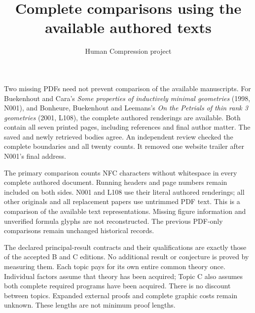 \documentclass[11pt,a4paper]{article}
\title{Complete comparisons using the available authored texts}
\author{Human Compression project}\date{}
\begin{document}
\maketitle
Two missing PDFs need not prevent comparison of the available manuscripts.
For Buekenhout and Cara's \emph{Some properties of inductively minimal
geometries} (1998, N001), and Bonheure, Buekenhout and Leemans's
\emph{On the Petrials of thin rank 3 geometries} (2001, L108), the complete
authored renderings are available. Both contain all seven printed pages,
including references and final author matter. The saved and newly retrieved
bodies agree. An independent review checked the complete boundaries and
all twenty counts. It removed one website trailer after N001's final address.

The primary comparison counts NFC characters without whitespace in every
complete authored document. Running headers and page numbers remain
included on both sides. N001 and L108 use their literal authored renderings;
all other originals and all replacement papers use untrimmed PDF text.
This is a comparison of the available text representations. Missing figure
information and unverified formula glyphs are not reconstructed.
The previous PDF-only comparisons remain unchanged historical records.

The declared principal-result contracts and their qualifications are exactly
those of the accepted B and C editions. No additional result or conjecture
is proved by measuring them. Each topic pays for its own entire common
theory once. Individual factors assume that theory has been acquired;
Topic C also assumes both complete required programs have been acquired.
There is no discount between topics. Expanded external proofs and complete
graphic costs remain unknown. These lengths are not minimum proof lengths.

\newpage
\end{document}
